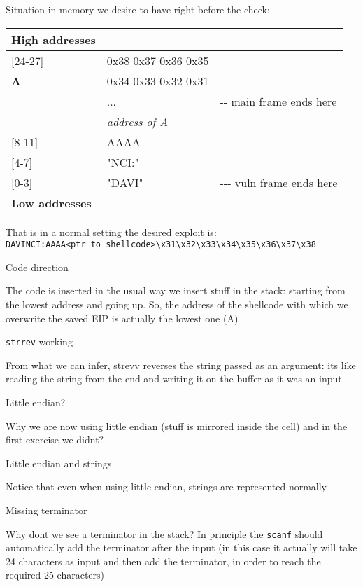 \documentclass[
]{article}
\begin{document}
Situation in memory we desire to have right before the check:

\begin{longtable}[]{@{}lll@{}}
\toprule\noalign{}
High addresses & & \\
\midrule\noalign{}
\endhead
\bottomrule\noalign{}
\endlastfoot
{[}24-27{]} & 0x38 0x37 0x36 0x35 & \\
\textbf{A} & 0x34 0x33 0x32 0x31 & \\
& ... & -\/- main frame ends here \\
& \emph{address of A} & \\
{[}8-11{]} & AAAA & \\
{[}4-7{]} & "NCI:" & \\
{[}0-3{]} & "DAVI" & -\/-\/- vuln frame ends here \\
\textbf{Low addresses} & & \\
\end{longtable}

That is in a normal setting the desired exploit is:
\texttt{DAVINCI:AAAA\textless{}ptr\_to\_shellcode\textgreater{}\textbackslash{}x31\textbackslash{}x32\textbackslash{}x33\textbackslash{}x34\textbackslash{}x35\textbackslash{}x36\textbackslash{}x37\textbackslash{}x38}

Code direction

The code is inserted in the usual way we insert stuff in the stack:
starting from the lowest address and going up. So, the address of the
shellcode with which we overwrite the saved EIP is actually the lowest
one (A)

\texttt{strrev} working

From what we can infer, strevv reverses the string passed as an
argument: it\textquotesingle s like reading the string from the end and
writing it on the buffer as it was an input

Little endian?

Why we are now using little endian (stuff is mirrored inside the cell)
and in the first exercise we didn\textquotesingle t?

Little endian and strings

Notice that even when using little endian, strings are represented
normally

Missing terminator

Why don\textquotesingle t we see a terminator in the stack? In principle
the \texttt{scanf} should automatically add the terminator after the
input (in this case it actually will take 24 characters as input and
then add the terminator, in order to reach the required 25 characters)
\end{document}
